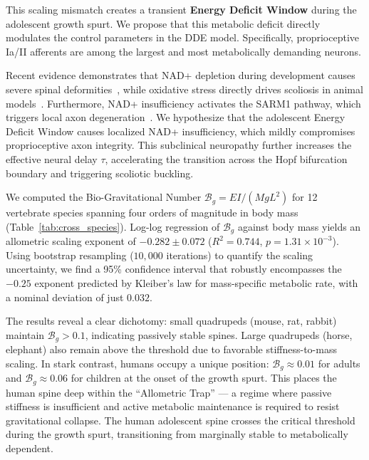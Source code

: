 \documentclass[11pt]{article}
\begin{document}
This scaling mismatch creates a transient \textbf{Energy Deficit Window} during the adolescent growth spurt. We propose that this metabolic deficit directly modulates the control parameters in the DDE model. Specifically, proprioceptive Ia/II afferents are among the largest and most metabolically demanding neurons.

Recent evidence demonstrates that NAD+ depletion during development causes severe spinal deformities~\cite{basse2021nampt}, while oxidative stress directly drives scoliosis in animal models~\cite{pumputis2025oxidative}. Furthermore, NAD+ insufficiency activates the SARM1 pathway, which triggers local axon degeneration~\cite{gerdts2015sarm1}. We hypothesize that the adolescent Energy Deficit Window causes localized NAD+ insufficiency, which mildly compromises proprioceptive axon integrity. This subclinical neuropathy further increases the effective neural delay $\tau$, accelerating the transition across the Hopf bifurcation boundary and triggering scoliotic buckling.

We computed the Bio-Gravitational Number $\mathcal{B}_g = EI/(MgL^2)$ for 12 vertebrate species spanning four orders of magnitude in body mass (Table~\ref{tab:cross_species}). Log-log regression of $\mathcal{B}_g$ against body mass yields an allometric scaling exponent of $-0.282 \pm 0.072$ ($R^2 = 0.744$, $p = 1.31 \times 10^{-3}$). Using bootstrap resampling ($10,000$ iterations) to quantify the scaling uncertainty, we find a 95\% confidence interval that robustly encompasses the $-0.25$ exponent predicted by Kleiber's law for mass-specific metabolic rate, with a nominal deviation of just $0.032$.

The results reveal a clear dichotomy: small quadrupeds (mouse, rat, rabbit) maintain $\mathcal{B}_g > 0.1$, indicating passively stable spines. Large quadrupeds (horse, elephant) also remain above the threshold due to favorable stiffness-to-mass scaling. In stark contrast, humans occupy a unique position: $\mathcal{B}_g \approx 0.01$ for adults and $\mathcal{B}_g \approx 0.06$ for children at the onset of the growth spurt. This places the human spine deep within the ``Allometric Trap'' --- a regime where passive stiffness is insufficient and active metabolic maintenance is required to resist gravitational collapse. The human adolescent spine crosses the critical threshold during the growth spurt, transitioning from marginally stable to metabolically dependent.
\end{document}
